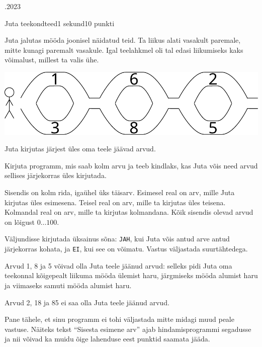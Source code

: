 \documentclass[a4paper,11pt]{article}
\begin{document}
\begin{ol}{\eio}{.2023}{\yle}{}
\begin{yl}{1}{Juta teekond}{teed}{1 sekund}{10 punkti}

Juta jalutas mööda joonisel näidatud teid. Ta liikus alati vasakult paremale, mitte kunagi paremalt vasakule. Igal teelahkmel oli tal edasi liikumiseks kaks võimalust, millest ta valis ühe.

\begin{center}
  \includegraphics{juta}
\end{center}

Juta kirjutas järjest üles oma teele jäävad arvud.

Kirjuta programm, mis saab kolm arvu ja teeb kindlaks, kas Juta võis need arvud sellises järjekorras üles kirjutada.

\sis Sisendis on kolm rida, igaühel üks täisarv. Esimesel real on arv, mille Juta kirjutas üles esimesena. Teisel real on arv, mille ta kirjutas üles teisena. Kolmandal real on arv, mille ta kirjutas kolmandana. Kõik sisendis olevad arvud on lõigust $0 \ldots 100$.

\val Väljundisse kirjutada üksainus sõna: \verb|JAH|, kui Juta võis antud arve antud järjekorras kohata, ja \verb|EI|, kui see on võimatu. Vastus väljastada suurtähtedega.

\nde[0]{3cm}{3cm}

Arvud 1, 8 ja 5 võivad olla Juta teele jäänud arvud: selleks pidi Juta oma teekonnal kõigepealt liikuma mööda ülemist haru, järgmiseks mööda alumist haru ja viimaseks samuti mööda alumist haru.

\nde[1]{3cm}{3cm}

Arvud 2, 18 ja 85 ei saa olla Juta teele jäänud arvud.

\mrk Pane tähele, et sinu programm ei tohi väljastada mitte midagi muud peale vastuse. Näiteks tekst ``Sisesta esimene arv'' ajab hindamisprogrammi segadusse ja nii võivad ka muidu õige lahenduse eest punktid saamata jääda.

\end{yl}
\end{ol}
\end{document}
